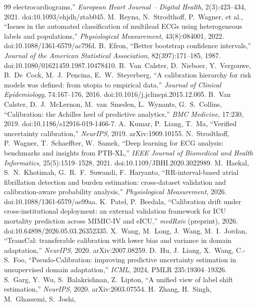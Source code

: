 \documentclass[12pt]{article}
\begin{document}
\begin{thebibliography}{99}
electrocardiograms,'' \emph{European Heart Journal -- Digital Health},
2(3):423--434, 2021. doi:10.1093/ehjdh/ztab045.
 M.~Reyna, N.~Strodthoff, P.~Wagner, et al.,
``Issues in the automated classification of multilead ECGs using
heterogeneous labels and populations,'' \emph{Physiological
Measurement}, 43(8):084001, 2022. doi:10.1088/1361-6579/ac79fd.
 B.~Efron, ``Better bootstrap confidence
intervals,'' \emph{Journal of the American Statistical Association},
82(397):171--185, 1987. doi:10.1080/01621459.1987.10478410.
 B.~Van~Calster, D.~Nieboer, Y.~Vergouwe,
B.~De~Cock, M.~J.~Pencina, E.~W.~Steyerberg, ``A calibration hierarchy for
risk models was defined: from utopia to empirical data,''
\emph{Journal of Clinical Epidemiology}, 74:167--176, 2016.
doi:10.1016/j.jclinepi.2015.12.005.
 B.~Van Calster, D.~J.~McLernon,
M.~van~Smeden, L.~Wynants, G.~S.~Collins, ``Calibration: the Achilles
heel of predictive analytics,'' \emph{BMC Medicine}, 17:230, 2019.
doi:10.1186/s12916-019-1466-7.
 A.~Kumar, P.~Liang, T.~Ma, ``Verified uncertainty
calibration,'' \emph{NeurIPS}, 2019. arXiv:1909.10155.
 N.~Strodthoff, P.~Wagner, T.~Schaeffter,
W.~Samek, ``Deep learning for ECG analysis: benchmarks and insights
from PTB-XL,'' \emph{IEEE Journal of Biomedical and Health
Informatics}, 25(5):1519--1528, 2021.
doi:10.1109/JBHI.2020.3022989.
 M.~Haekal, S.~N.~Khotimah,
G.~R.~F.~Suwandi, F.~Haryanto, ``RR-interval-based atrial fibrillation
detection and burden estimation: cross-dataset validation and
calibration-aware probability analysis,'' \emph{Physiological
Measurement}, 2026. doi:10.1088/1361-6579/ae99aa.
 K.~Patel, P.~Beedala, ``Calibration drift under
cross-institutional deployment: an external validation framework for
ICU mortality prediction across MIMIC-IV and eICU,'' \emph{medRxiv}
(preprint), 2026. doi:10.64898/2026.05.03.26352335.
 X.~Wang, M.~Long, J.~Wang, M.~I.~Jordan,
``TransCal: transferable calibration with lower bias and variance in
domain adaptation,'' \emph{NeurIPS}, 2020. arXiv:2007.08259.
 D.~Hu, J.~Liang, X.~Wang, C.-S.~Foo,
``Pseudo-Calibration: improving predictive uncertainty estimation in
unsupervised domain adaptation,'' \emph{ICML}, 2024,
PMLR 235:19304--19326.
 S.~Garg, Y.~Wu, S.~Balakrishnan,
Z.~Lipton, ``A unified view of label shift estimation,''
\emph{NeurIPS}, 2020. arXiv:2003.07554.
 H.~Zhang, H.~Singh, M.~Ghassemi, S.~Joshi,

\end{thebibliography}
\end{document}

